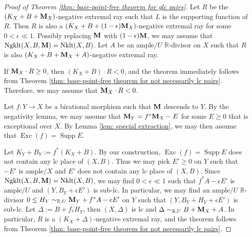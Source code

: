 \documentclass[11pt]{amsart}
\numberwithin{equation}{section}
\newcommand{\Mm}{{\bf{M}}}
\newcommand{\Rr}{\mathbb{R}}
\newcommand{\Exc}{\operatorname{Exc}}
\newcommand{\Nklt}{\operatorname{Nklt}}
\newcommand{\Supp}{\operatorname{Supp}}
\newcommand{\Ngklt}{\operatorname{Ngklt}}
\theoremstyle{definition}
\theoremstyle{definition}
\theoremstyle{definition}
\begin{document}
\begin{proof}[Proof of Theorem \ref{thm: base-point-free theorem for glc pairs}]

Let $R$ be the $(K_X+B+\Mm_X)$-negative extremal ray such that $L$ is the supporting function of $R$. Then $R$ is also a $(K_X+B+(1-\epsilon)\Mm_X)$-negative extremal ray for some $0<\epsilon\ll 1$. Possibly replacing $\Mm$ with $(1-\epsilon)\Mm$, we may assume that $\Ngklt(X,B,\Mm)=\Nklt(X,B)$. Let $A$ be an ample$/U$ $\Rr$-divisor on $X$ such that $R$ is also $(K_X+B+\Mm_X+A)$-negative extremal ray.

If $\Mm_X\cdot R\geq 0$, then $(K_X+B)\cdot R<0$, and the theorem immediately follows from Theorem \ref{thm: base-point-free theorem for not necessarily lc pairs}. Therefore, we may assume that $\Mm_X\cdot R<0$.

Let $f: Y\rightarrow X$ be a birational morphism such that $\Mm$ descends to $Y$. By the negativity lemma, we may assume that $\Mm_Y=f^*\Mm_X-E$ for some $E\geq 0$ that is exceptional over $X$. 
By Lemma \ref{lem: special extraction}, we may then assume that $\Exc(f)=\Supp E$.

Let $K_Y+B_Y:=f^*(K_X+B)$. By our construction, $\Exc(f)= \Supp E$ does not contain any lc place of $(X,B)$. Thus we may pick $E'\geq 0$ on $Y$ such that $-E'$ is ample$/X$ and $E'$ does not contain any lc place of $(X,B)$. Since $\Ngklt(X,B,\Mm)=\Nklt(X,B)$, we may find $0<\epsilon\ll 1$ such that $f^*A-\epsilon E'$ is ample$/U$ and $(Y,B_Y+\epsilon E')$ is sub-lc. In particular, we may find an ample$/U$ $\Rr$-divisor $0\leq H_Y\sim_{\Rr,U}\Mm_Y+f^*A-\epsilon E'$ on $Y$ such that $(Y,B_Y+H_Y+\epsilon E')$ is sub-lc. Let $\Delta:=B+f_*H_Y$, then $(X,\Delta)$ is lc and $\Delta\sim_{\Rr,U}B+\Mm_X+A$. In particular, $R$ is a $(K_X+\Delta)$-negative extremal ray, and the theorem follows from Theorem \ref{thm: base-point-free theorem for not necessarily lc pairs}.
\end{proof}
\end{document}
